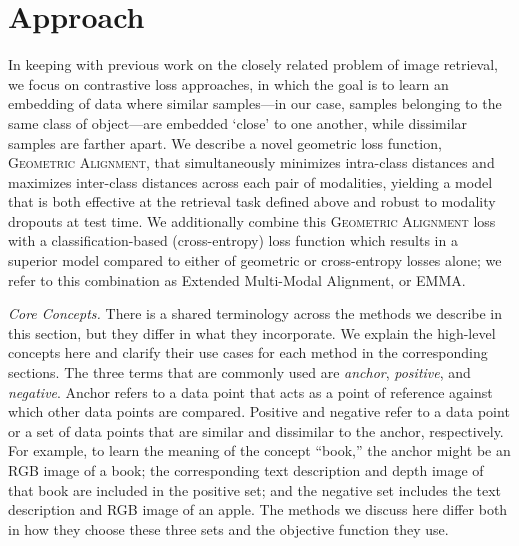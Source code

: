 \documentclass[sigconf,natbib=true,anonymous=true]{acmart}
\newcommand{\ours}{\textsc{EMMA}}
\newcommand{\geom}{\textsc{Geometric Alignment}}
\begin{document}

\section{Approach}
\label{sec:Method}

In keeping with previous work on the closely related problem of image retrieval, we focus on contrastive loss approaches, in which the goal is to learn an embedding of data where similar samples---in our case, samples belonging to the same class of object---are embedded `close' to one another, while dissimilar samples are farther apart. We describe a novel geometric loss function, \geom{}, that simultaneously minimizes intra-class distances and maximizes inter-class distances across each pair of modalities, yielding a model that is both effective at the retrieval task defined above and robust to modality dropouts at test time. We additionally combine this \geom{} loss with a classification-based (cross-entropy) loss function which results in a superior model compared to either of geometric or cross-entropy losses alone; we refer to this combination as Extended Multi-Modal Alignment, or \ours{}.

\textit{Core Concepts. }
There is a shared terminology across the methods we describe in this section, but they differ in what they incorporate. We explain the high-level concepts here and clarify their use cases for each method in the corresponding sections.
The three terms that are commonly used are \textit{anchor}, \textit{positive}, and \textit{negative}. Anchor refers to a data point that acts as a point of reference against which other data points are compared. Positive and negative refer to a data point or a set of data points that are similar and dissimilar to the anchor, respectively.
% 
For example, to learn the meaning of the concept ``book,'' the anchor might be an RGB image of a book; the corresponding text description and depth image of that book are included in the positive set; and the negative set includes the text description and RGB image of an apple.
% 
The methods we discuss here differ both in how they choose these three sets and the objective function they use.
\end{document}
